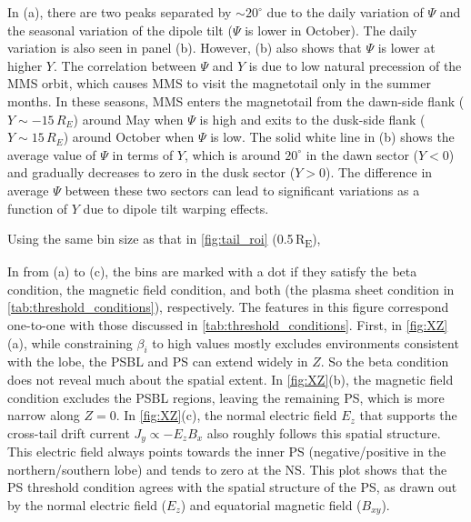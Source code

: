 \documentclass[draft]{agujournal2019}
\begin{document}
In (a), there are two peaks separated by $\sim20^\circ$ due to the daily variation of $\Psi$ and the seasonal variation of the dipole tilt ($\Psi$ is lower in October). The daily variation is also seen in panel (b). However, (b) also shows that $\Psi$ is lower at higher $Y$. The correlation between $\Psi$ and $Y$ is due to low natural precession of the MMS orbit, which causes MMS to visit the magnetotail only in the summer months. In these seasons, MMS enters the magnetotail from the dawn-side flank (${Y\sim-15\,\si{R_E}}$) around May when $\Psi$ is high and exits to the dusk-side flank (${Y\sim15\,\si{R_E}}$) around October when $\Psi$ is low. The solid white line in (b) shows the average value of $\Psi$ in terms of $Y$, which is around $20^\circ$ in the dawn sector (${Y<0}$) and gradually decreases to zero in the dusk sector (${Y>0}$). The difference in average $\Psi$ between these two sectors can lead to significant variations as a function of $Y$ due to dipole tilt warping effects.

Using the same bin size as that in \cref{fig:tail_roi} (0.5\,\si{R_E}),

In  from (a) to (c), the bins are marked with a dot if they satisfy the beta condition, the magnetic field condition, and both (the plasma sheet condition in \cref{tab:threshold_conditions}), respectively. The features in this figure correspond one-to-one with those discussed in \cref{tab:threshold_conditions}. First, in \cref{fig:XZ}(a), while constraining $\beta_i$ to high values mostly excludes environments consistent with the lobe, the PSBL and PS can extend widely in $Z$. So the beta condition does not reveal much about the spatial extent. In \cref{fig:XZ}(b), the magnetic field condition excludes the PSBL regions, leaving the remaining PS, which is more narrow along ${Z=0}$. In \cref{fig:XZ}(c), the normal electric field $E_z$ that supports the cross-tail drift current ${J_y\propto-E_zB_x}$ also roughly follows this spatial structure. This electric field always points towards the inner PS (negative/positive in the northern/southern lobe) and tends to zero at the NS. This plot shows that the PS threshold condition agrees with the spatial structure of the PS, as drawn out by the normal electric field ($E_z$) and equatorial magnetic field ($B_{xy}$).
\end{document}
